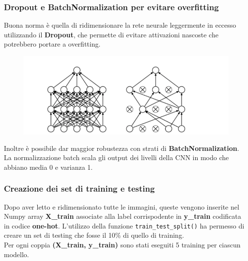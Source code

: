 \documentclass{beamer}
\begin{document}
\begin{frame}
	\frametitle{Dropout e BatchNormalization per evitare overfitting}
		Buona norma è quella di ridimensionare la rete neurale leggermente in eccesso utilizzando il \textbf{Dropout},
		che permette di evitare attivazioni nascoste che potrebbero portare a overfitting. \\
		\begin{figure}
			\includegraphics[width=1\textwidth]{dropout.PNG}
		\end{figure}
		Inoltre è possibile dar maggior robustezza con strati di \textbf{BatchNormalization}.
		La normalizzazione batch scala gli output dei livelli della CNN in modo che abbiano media 0 e varianza 1.\\
	\end{frame}



	\begin{frame}[fragile]
		\frametitle{Creazione dei set di training e testing}
		Dopo aver letto e ridimensionato tutte le immagini, queste vengono inserite nel
		Numpy array \textbf{X\_train} associate alla label corrispodente in \textbf{y\_train} 
		codificata in codice \textbf{one-hot}.
		L'utilizzo della funzione \lstinline{train_test_split()} ha permesso di creare 
		un set di testing che fosse il 10\%  di quello di training.\\
		Per ogni coppia \textbf{(X\_train, y\_train)} sono stati eseguiti 5 training per ciascun modello.
		\end{frame}
		
\end{document}
